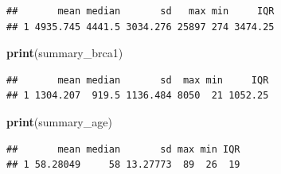 \documentclass[
]{article}
\newenvironment{Shaded}{\begin{snugshade}}{\end{snugshade}}
\newcommand{\FunctionTok}[1]{\textcolor[rgb]{0.13,0.29,0.53}{\textbf{#1}}}
\newcommand{\NormalTok}[1]{#1}
\begin{document}
\begin{verbatim}
##       mean median       sd   max min     IQR
## 1 4935.745 4441.5 3034.276 25897 274 3474.25
\end{verbatim}

\begin{Shaded}
\begin{Highlighting}[]
\FunctionTok{print}\NormalTok{(summary\_brca1)}
\end{Highlighting}
\end{Shaded}

\begin{verbatim}
##       mean median       sd  max min     IQR
## 1 1304.207  919.5 1136.484 8050  21 1052.25
\end{verbatim}

\begin{Shaded}
\begin{Highlighting}[]
\FunctionTok{print}\NormalTok{(summary\_age)}
\end{Highlighting}
\end{Shaded}

\begin{verbatim}
##       mean median       sd max min IQR
## 1 58.28049     58 13.27773  89  26  19
\end{verbatim}
\end{document}
